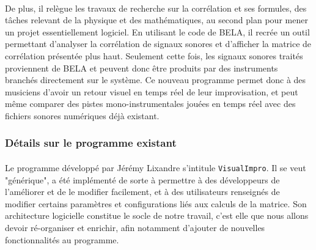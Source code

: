 \paragraph{}
De plus, il relègue les travaux de recherche sur la corrélation et ses
formules, des tâches relevant de la physique et des mathématiques, au
second plan pour mener un projet essentiellement logiciel. En
utilisant le code de BELA, il recrée un outil permettant d'analyser la
corrélation de signaux sonores et d'afficher la matrice de corrélation
présentée plus haut. Seulement cette fois, les signaux sonores traités
proviennent de BELA et peuvent donc être produits par des instruments
branchés directement sur le système. Ce nouveau programme permet donc
à des musiciens d'avoir un retour visuel en temps réel de leur
improvisation, et peut même comparer des pistes mono-instrumentales
jouées en temps réel avec des fichiers sonores numériques déjà
existant.
%	

\subsubsection{Détails sur le programme existant}
\paragraph{}
Le programme développé par Jérémy Lixandre s'intitule
\verb!VisualImpro!. Il se veut "générique", a été implémenté de sorte
à permettre à des développeurs de l'améliorer et de le modifier
facilement, et à des utilisateurs renseignés de modifier certains
paramètres et configurations liés aux calculs de la matrice. Son
architecture logicielle constitue le socle de notre travail, c'est
elle que nous allons devoir ré-organiser et enrichir, afin notamment
d'ajouter de nouvelles fonctionnalités au programme.
